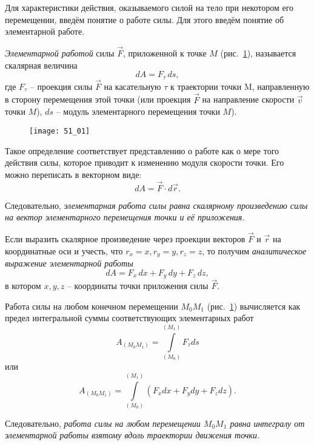 
Для характеристики действия, оказываемого силой на тело при некотором его 
перемещении, введём понятие о работе силы. Для этого введём понятие об 
элементарной работе.

\emph{Элементарной работой} силы \( \vec{F} \), приложенной к точке 
\( M \) (рис.~\ref{pic51_01}), называется скалярная величина
\[
	dA = F_\tau\,ds,
\]
где \( F_\tau \) -- проекция силы \( \vec{F} \) на касательную \( \tau \) 
к траектории точки M, направленную в сторону перемещения этой точки 
(или проекция \( \vec{F} \) на направление скорости \( \vec{v} \) точки 
\( M \)), \( ds \) -- модуль элементарного перемещения точки \( M \)).

\begin{figure}[h!]
	\center
    \texttt{[image: 51\_01]}
    \caption{}
    \label{pic51_01}
\end{figure}

Такое определение соответствует представлению о работе как о мере того 
действия силы, которое приводит к изменению модуля скорости точки. Его можно
переписать в векторном виде:
\[
    dA = \vec{F}\cdot d\vec{r}.
\]

Следовательно, \emph{элементарная работа силы равна скалярному произведению 
силы на вектор элементарного перемещения точки и её приложения.}

Если выразить скалярное произведение через проекции векторов \( \vec{F} \) 
и \( \vec{r} \) на координатные оси и учесть, что 
\( r_x = x, r_y = y, r_z = z \), то получим \emph{аналитическое выражение 
элементарной работы}
\[
    dA = F_x\,dx + F_y\,dy + F_z\,dz,
\]
в котором \( x, y, z \) -- координаты точки приложения силы \( \vec{F} \).

Работа силы на любом конечном перемещении \( M_0 M_1 \) (рис.~\ref{pic51_01}) 
вычисляется как предел интегральной суммы соответствующих элементарных 
работ 
\[
    A_{(M_0 M_1)} = \int\limits_{(M_0)}^{(M_1)} F_\tau ds
\]
или 
\[ 
    A_{(M_0 M_1)} = \int\limits_{(M_0)}^{(M_1)} 
    \left( F_x dx + F_y dy + F_z dz \right).
\]

Следовательно, \emph{работа силы на любом перемещении \( M_0 M_1 \) равна 
интегралу от элементарной работы взятому вдоль траектории движения точки.}

